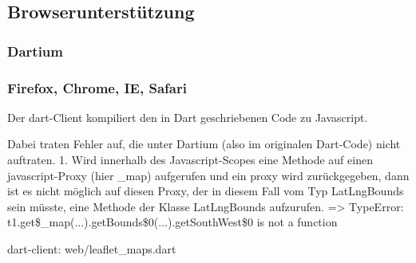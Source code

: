 \subsection{Browserunterstützung}
\subsubsection{Dartium}

\subsubsection{Firefox, Chrome, IE, Safari}

Der dart-Client kompiliert den in Dart geschriebenen Code zu Javascript.

Dabei traten Fehler auf, die unter Dartium (also im originalen Dart-Code) nicht auftraten.
1. Wird innerhalb des Javascript-Scopes eine Methode auf einen javascript-Proxy (hier \_map) aufgerufen und ein proxy wird zurückgegeben, dann ist es nicht möglich auf diesen Proxy, der in diesem Fall vom Typ LatLngBounds sein müsste, eine Methode der Klasse LatLngBounds aufzurufen. => TypeError: t1.get\$\_map(...).getBounds\$0(...).getSouthWest\$0 is not a function

dart-client: web/leaflet\_maps.dart

